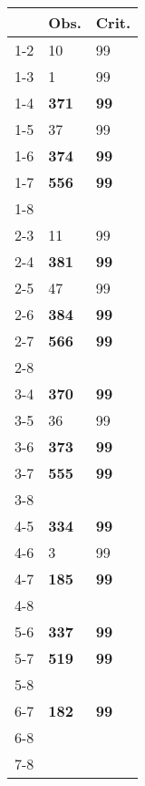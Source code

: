 \begin{table}[ht]
\centering
\begin{tabular}{rll}
  \hline
 & Obs. & Crit. \\ 
  \hline
1-2 & 10 & 99 \\ 
  1-3 & 1 & 99 \\ 
  1-4 & \textbf{371} & \textbf{99} \\ 
  1-5 & 37 & 99 \\ 
  1-6 & \textbf{374} & \textbf{99} \\ 
  1-7 & \textbf{556} & \textbf{99} \\ 
  1-8 &  &  \\ 
  2-3 & 11 & 99 \\ 
  2-4 & \textbf{381} & \textbf{99} \\ 
  2-5 & 47 & 99 \\ 
  2-6 & \textbf{384} & \textbf{99} \\ 
  2-7 & \textbf{566} & \textbf{99} \\ 
  2-8 &  &  \\ 
  3-4 & \textbf{370} & \textbf{99} \\ 
  3-5 & 36 & 99 \\ 
  3-6 & \textbf{373} & \textbf{99} \\ 
  3-7 & \textbf{555} & \textbf{99} \\ 
  3-8 &  &  \\ 
  4-5 & \textbf{334} & \textbf{99} \\ 
  4-6 & 3 & 99 \\ 
  4-7 & \textbf{185} & \textbf{99} \\ 
  4-8 &  &  \\ 
  5-6 & \textbf{337} & \textbf{99} \\ 
  5-7 & \textbf{519} & \textbf{99} \\ 
  5-8 &  &  \\ 
  6-7 & \textbf{182} & \textbf{99} \\ 
  6-8 &  &  \\ 
  7-8 &  &  \\ 
   \hline
\end{tabular}
\end{table}
